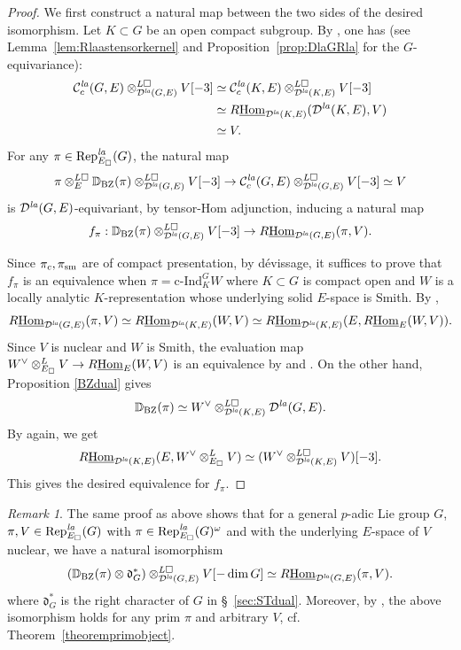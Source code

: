 \documentclass[a4paper,10pt]{amsart}
\theoremstyle{remark}
\newtheorem{remark}[theorem]{Remark}
\theoremstyle{definition}
\theoremstyle{plain}
\numberwithin{equation}{section}
\newcommand{\bbD}{{\mathbb D}}
\newcommand{\frd}{{\mathfrak d}}
\newcommand{\calC}{{\mathcal C}}
\newcommand{\calD}{{\mathcal D}}
\newcommand{\Hom}{{\rm Hom}}
\newcommand{\uHom}{\underline{\Hom}}
\newcommand{\la}{{\it la}}
\newcommand{\Rep}{{\rm Rep}}
\newcommand{\sm}{{\rm sm}}
\newcommand{\cInd}{\mathrm{c\text{-}Ind}}
\newcommand{\BZ}{\ensuremath{\mathrm{BZ}}}
\begin{document}
\begin{proof}
We first construct a natural map between the two sides of the desired isomorphism. Let $K\subset G$ be an open compact subgroup. By \cite[Prop.~3.2.12(2)\& Prop.~A.2.1(4)]{JC23}, one has (see Lemma~\ref{lem:Rlaastensorkernel} and Proposition~\ref{prop:DlaGRla} for the $G$-equivariance):
\begin{align*}
	\calC_c^{\la}(G,E)\otimes_{\calD^{\la}(G,E)}^{L\square}V[-3]&\simeq \calC_c^{\la}(K,E)\otimes_{\calD^{\la}(K,E)}^{L\square}V[-3]\\
	&\simeq R\uHom_{\calD^{\la}(K,E)}(\calD^{\la}(K,E),V)\\
	&\simeq V.
\end{align*} 
For any $\pi\in \Rep^{\la}_{E_\square}(G)$, the natural map
\[ \pi\otimes_E^{L\square} \bbD_{\BZ}(\pi)\otimes^{L\square}_{\calD^{\la}(G,E)}V[-3]\to \calC_c^{\la}(G,E)\otimes^{L\square}_{\calD^{\la}(G,E)}V[-3]\simeq V\]
is $\calD^{\la}(G,E)$-equivariant, by tensor-Hom adjunction, inducing a natural map
\[f_\pi:\bbD_{\BZ}(\pi)\otimes^{L\square}_{\calD^{\la}(G,E)}V[-3]\rightarrow R\uHom_{\calD^{\la}(G,E)}(\pi,V).\] 

Since $\pi_c,\pi_{\sm}$ are of compact presentation, by d\'evissage, it suffices to prove that $f_\pi$ is an equivalence when $\pi=\cInd_K^{G}W$ where $K\subset G$ is compact open and $W$ is a locally analytic $K$-representation whose underlying solid $E$-space is Smith. By \cite[Prop.~A.2.1(4)]{JC23},
\begin{align*}
 R\uHom_{\calD^{\la}(G,E)}(\pi,V) \simeq R\uHom_{\calD^{\la}(K,E)}(W,V) \simeq R\uHom_{\calD^{\la}(K,E)}
 (E,R\uHom_{E}(W,V)).
\end{align*}
Since $V$ is nuclear and $W$ is Smith, the evaluation map $W^\vee\otimes^L_{E_\square}V\to R\uHom_{E}(W,V)$ is an equivalence by \cite[Prop.~5.35]{andreychev2021pseudocoherent} and \cite[Lem.~3.8(2) \& Lem.~3.10]{rodrigues2022solid}. On the other hand, Proposition \ref{BZdual} gives
\[
 \bbD_{\BZ}(\pi)\simeq
 W^\vee\otimes^{L\square}_{\calD^{\la}(K,E)}\calD^{\la}(G,E).
\]
By \cite[Prop.~3.2.12(2)]{JC23} again, we get
\[
 R\uHom_{\calD^{\la}(K,E)}
 (E,W^\vee\otimes^{L}_{E_\square}V)
 \simeq(W^\vee\otimes^{L\square}_{\calD^{\la}(K,E)}V)[-3].
\]
This gives the desired equivalence for $f_{\pi}$. 
\end{proof}
\begin{remark}\label{BZ-tensor-Hom}
	The same proof as above shows that for a general $p$-adic Lie group $G$, $ \pi,V\in \mathrm{Rep}_{E_{\square}}^{\la}(G)$ with $\pi \in \mathrm{Rep}_{E_{\square}}^{\la}(G)^{\omega}$ and with the underlying $E$-space of $V$ nuclear, we have a natural isomorphism
	\begin{align*}
		(\bbD_{\BZ}(\pi)\otimes \frd_G^*)\otimes^{L\square}_{\calD^{\la}(G,E)}V[-\dim G]\simeq R\uHom_{\calD^{\la}(G,E)}(\pi,V).
	\end{align*}
	where $\frd_G^*$ is the right character of $G$ in \S~\ref{sec:STdual}. Moreover, by \cite[Lem.~4.4.6]{heyer20246functor}, the above isomorphism holds for any prim $\pi$ and arbitrary $V$, cf. Theorem~\ref{theoremprimobject}.
\end{remark}
\end{document}
